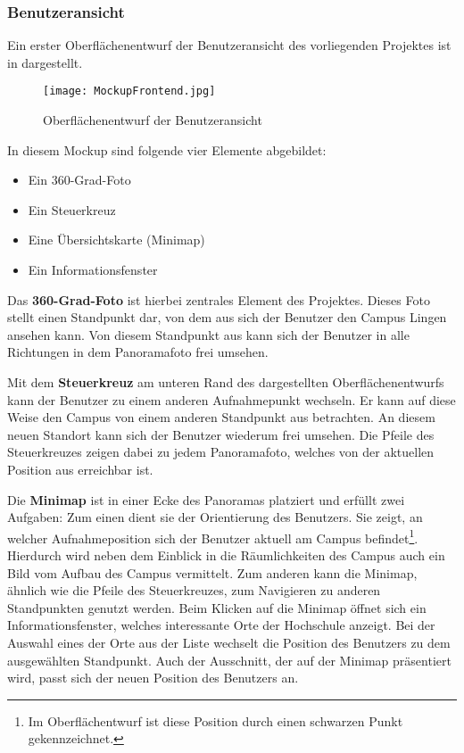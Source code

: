 \subsubsection{Benutzeransicht}
\label{sec:Benutzeransicht}

Ein erster Oberflächenentwurf der Benutzeransicht des vorliegenden Projektes
ist in  dargestellt.

\begin{figure}[htb]
\centering
\texttt{[image: MockupFrontend.jpg]}
\caption[Oberflächenentwurf der
Benutzeransicht]{Oberflächenentwurf der
Benutzeransicht\protect\footnotemark}
\label{fig:MockupFrontend}
\end{figure}

\clearpage

In diesem Mockup sind folgende vier Elemente abgebildet:

\begin{itemize}
 \item Ein 360-Grad-Foto
 \item Ein Steuerkreuz
 \item Eine Übersichtskarte (Minimap)
 \item Ein Informationsfenster
\end{itemize}

Das \textbf{360-Grad-Foto} ist hierbei zentrales Element des Projektes. Dieses
Foto stellt einen Standpunkt dar, von dem aus sich der Benutzer den Campus
Lingen ansehen kann. Von diesem Standpunkt aus kann sich der Benutzer in alle
Richtungen in dem Panoramafoto frei umsehen.

Mit dem \textbf{Steuerkreuz} am unteren Rand des dargestellten
Oberflächenentwurfs kann der Benutzer zu einem anderen Aufnahmepunkt wechseln.
Er kann auf diese Weise den Campus von einem anderen Standpunkt aus betrachten.
An diesem neuen Standort kann sich der Benutzer wiederum frei umsehen. Die
Pfeile des Steuerkreuzes zeigen dabei zu jedem Panoramafoto, welches von der
aktuellen Position aus erreichbar ist.

Die \textbf{Minimap} ist in einer Ecke des Panoramas platziert und erfüllt
zwei Aufgaben: Zum einen dient sie der Orientierung des Benutzers. Sie zeigt, an
welcher Aufnahmeposition sich der Benutzer aktuell am Campus
befindet\footnote{Im Oberflächentwurf ist diese Position durch einen schwarzen
Punkt gekennzeichnet.}. Hierdurch wird neben dem Einblick in die Räumlichkeiten
des Campus auch ein Bild vom Aufbau des Campus vermittelt. Zum anderen kann die
Minimap, ähnlich wie die Pfeile des Steuerkreuzes, zum Navigieren zu anderen
Standpunkten genutzt werden. Beim Klicken auf die Minimap öffnet sich ein
Informationsfenster, welches interessante Orte der Hochschule anzeigt. Bei der
Auswahl eines der Orte aus der Liste wechselt die Position des Benutzers zu
dem ausgewählten Standpunkt. Auch der Ausschnitt, der auf der Minimap
präsentiert wird, passt sich der neuen Position des Benutzers an.

